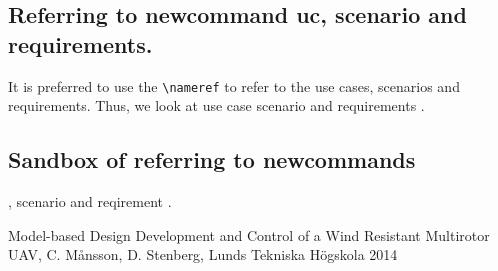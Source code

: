 \documentclass[a4paper]{article}
\begin{document}
\subsection{Referring to newcommand uc, scenario and requirements.}
It is preferred to use the \verb!\nameref! to refer to the use cases, scenarios and requirements.
Thus, we look at use case  scenario  and requirements .

\subsection{Sandbox of referring to newcommands}
, scenario  and reqirement .


\begin{thebibliography}{99}
 Model-based Design Development and Control of a Wind Resistant Multirotor UAV, C. Månsson, D. Stenberg, Lunds Tekniska Högskola 2014
\end{thebibliography}
\end{document}
